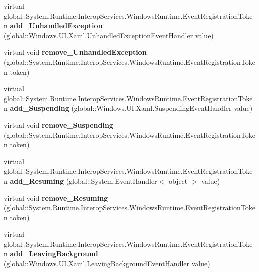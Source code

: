 \begin{DoxyCompactItemize}
virtual global\+::\+System.\+Runtime.\+Interop\+Services.\+Windows\+Runtime.\+Event\+Registration\+Token {\bfseries add\+\_\+\+Unhandled\+Exception} (global\+::\+Windows.\+U\+I.\+Xaml.\+Unhandled\+Exception\+Event\+Handler value)
\item 
\mbox{\label{class_windows_1_1_u_i_1_1_xaml_1_1_application_ab4bbcd1b2fae8d35eae530ebe85732ba}} 
virtual void {\bfseries remove\+\_\+\+Unhandled\+Exception} (global\+::\+System.\+Runtime.\+Interop\+Services.\+Windows\+Runtime.\+Event\+Registration\+Token token)
\item 
\mbox{\label{class_windows_1_1_u_i_1_1_xaml_1_1_application_ac22db715c72a7c090a65a2657417c4e6}} 
virtual global\+::\+System.\+Runtime.\+Interop\+Services.\+Windows\+Runtime.\+Event\+Registration\+Token {\bfseries add\+\_\+\+Suspending} (global\+::\+Windows.\+U\+I.\+Xaml.\+Suspending\+Event\+Handler value)
\item 
\mbox{\label{class_windows_1_1_u_i_1_1_xaml_1_1_application_a697beee9101ae37839824e38fb697688}} 
virtual void {\bfseries remove\+\_\+\+Suspending} (global\+::\+System.\+Runtime.\+Interop\+Services.\+Windows\+Runtime.\+Event\+Registration\+Token token)
\item 
\mbox{\label{class_windows_1_1_u_i_1_1_xaml_1_1_application_aebc7735fefc7c00f75274d1e1dad4cc1}} 
virtual global\+::\+System.\+Runtime.\+Interop\+Services.\+Windows\+Runtime.\+Event\+Registration\+Token {\bfseries add\+\_\+\+Resuming} (global\+::\+System.\+Event\+Handler$<$ object $>$ value)
\item 
\mbox{\label{class_windows_1_1_u_i_1_1_xaml_1_1_application_ae71f03dad163a08e042d3b65126ad419}} 
virtual void {\bfseries remove\+\_\+\+Resuming} (global\+::\+System.\+Runtime.\+Interop\+Services.\+Windows\+Runtime.\+Event\+Registration\+Token token)
\item 
\mbox{\label{class_windows_1_1_u_i_1_1_xaml_1_1_application_a652fc06a2f576820519f4a6302fa3a92}} 
virtual global\+::\+System.\+Runtime.\+Interop\+Services.\+Windows\+Runtime.\+Event\+Registration\+Token {\bfseries add\+\_\+\+Leaving\+Background} (global\+::\+Windows.\+U\+I.\+Xaml.\+Leaving\+Background\+Event\+Handler value)

\end{DoxyCompactItemize}
